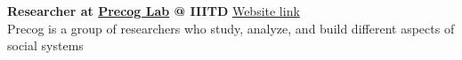 \documentclass[]{deedy-resume-reversed}
\begin{document}
\begin{minipage}[t]{0.60\textwidth}
\textbf{Researcher at \href{http://precog.iiitd.edu.in/}{Precog Lab} @ IIITD} \href{http://precog.iiitd.edu.in/}{Website link}\\
\textbullet{} Precog is a group of researchers who study, analyze, and build different aspects of social systems










\end{minipage}
\end{document}

